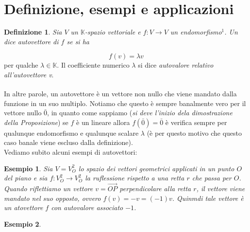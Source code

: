 \documentclass{book}
\newtheorem*{definizione}{Definizione}
\newtheorem*{esempio} {Esempio}
\begin{document}
\section{Definizione, esempi e applicazioni}
\begin{definizione}
	Sia $V$ un $\mathds{K}$-spazio vettoriale e $f:V\to V$ un endomorfismo$^1$. Un dice \textit{autovettore} di $f$ se si ha 
\end{definizione}
\begin{equation}
	f(v)=\lambda v
\end{equation}
per qualche $\lambda \in \mathds{K}$.
Il coefficiente numerico $\lambda$ si dice \textit{autovalore relativo all'autovettore v}.\\\\
In altre parole, un autovettore è un vettore non nullo che viene mandato dalla funzione in un suo multiplo. Notiamo che questo è sempre banalmente vero per il vettore nullo $\bar{0}$, in quanto come sappiamo (\textit{si deve l'inizio dela dimostrazione della Proposizione}) se $f$ è un lineare allora $f(\bar{0})=\bar{0}$ è verifica sempre per qualunque endomorfismo e qualunque scalare $\lambda$ (è per questo motivo che questo caso banale viene escluso dalla definizione).\\
Vediamo subito alcuni esempi di autovettori:
\begin{esempio}
  Sia $V=V_O^2$ lo spazio dei vettori geometrici applicati in un punto $O$ del piano e sia $f:V^2_O\to V_O^2$ la ruflessione rispetto a una retta $r$ che passa per $O$. Quando riflettiamo un vettore $v=\vec{OP}$ perpendicolare alla retta $r$, il vettore viene mandato nel suo opposto, ovvero $f(v) = -v =(-1)v$. Quinmdi tale vettore è un atovettore $f$ con autovalore associato $-1$.
\end{esempio}
\begin{esempio}


\end{esempio}


\printindex
\end{document}
